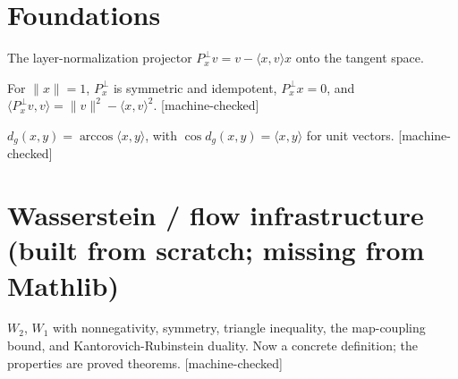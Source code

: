 %

\section{Foundations}

\begin{definition}\label{def:projector}\leanok
The layer-normalization projector $P_x^\perp v = v - \langle x, v\rangle x$ onto the tangent space.
\end{definition}

\begin{lemma}\label{lem:projector}\leanok
For $\|x\|=1$, $P_x^\perp$ is symmetric and idempotent, $P_x^\perp x = 0$, and
$\langle P_x^\perp v, v\rangle = \|v\|^2 - \langle x,v\rangle^2$. [machine-checked]
\end{lemma}

\begin{definition}\label{def:dg}\leanok
$d_g(x,y) = \arccos\langle x,y\rangle$, with $\cos d_g(x,y) = \langle x,y\rangle$ for unit vectors. [machine-checked]
\end{definition}

\section{Wasserstein / flow infrastructure (built from scratch; missing from Mathlib)}

\begin{definition}\label{ax:W2}
$W_2$, $W_1$ with nonnegativity, symmetry, triangle inequality, the map-coupling bound, and
Kantorovich-Rubinstein duality. Now a concrete definition; the properties are proved theorems. [machine-checked]
\end{definition}

